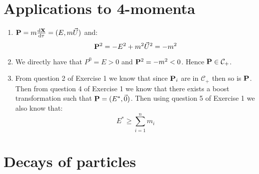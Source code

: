 \documentclass[10pt,a4paper]{book}
\begin{document}
\section{Applications to 4-momenta}
\begin{enumerate}

\item  $\vb{P} = m \dv{\vb{X}}{\vb{\tau}} = (E, m \vec{U})$ and:
\[
\vb{P}^2 = - E^2 + m^2 \vec{U}^2 = -m^2 
\]

\item We directly have that $P^0 = E > 0$ and $\vb{P}^2 = -m^2 < 0$. Hence $\vb{P} \in \mathcal{C}_+$. 

\item From question 2 of Exercise 1 we know that since $\vb{P}_i$ are in $\mathcal{C}_+$ then so is $\vb{P}$. Then from question 4 of Exercise 1 we know that there exists a boost transformation such that $\vb{P} = (E^*, \vec{0})$. Then using question 5 of Exercise 1 we also know that:
\[
E^* \geq \sum_{i = 1}^n m_i 
\]

\end{enumerate}

\section{Decays of particles}
\end{document}
